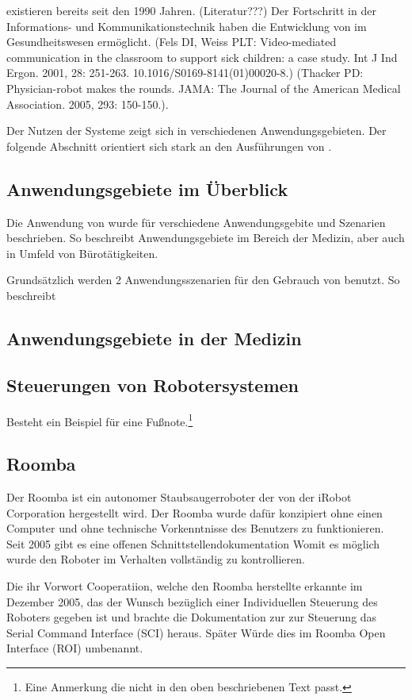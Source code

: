 \tp existieren bereits seit den 1990 Jahren. (Literatur???)
Der Fortschritt in der Informations- und Kommunikationstechnik haben die Entwicklung von \tp im Gesundheitswesen ermöglicht. (Fels DI, Weiss PLT: Video-mediated communication in the classroom to support sick children: a case study. Int J Ind Ergon. 2001, 28: 251-263. 10.1016/S0169-8141(01)00020-8.) (Thacker PD: Physician-robot makes the rounds. JAMA: The Journal of the American Medical Association. 2005, 293: 150-150.).

Der Nutzen der Systeme zeigt sich in verschiedenen Anwendungsgebieten. Der folgende Abschnitt orientiert sich stark an den Ausführungen von \cite{Kristoffersson2013}.

\subsection{Anwendungsgebiete im Überblick}
\label{section:XXX}

Die Anwendung von \tp wurde für verschiedene Anwendungsgebite und Szenarien beschrieben. So beschreibt \cite{Kristoffersson2013} Anwendungsgebiete im Bereich der Medizin, aber auch in Umfeld von Bürotätigkeiten. 

Grundsätzlich werden 2 Anwendungsszenarien für den Gebrauch von \tp benutzt. So beschreibt 
\subsection{Anwendungsgebiete in der Medizin}
\label{section:XXX}
\subsection{Steuerungen von Robotersystemen}
\label{section:XXX}

Besteht ein Beispiel für eine Fußnote.\footnote{Eine Anmerkung die nicht in den oben beschriebenen Text passt.}

\subsection{Roomba}
Der Roomba ist ein autonomer Staubsaugerroboter der von der iRobot Corporation hergestellt wird. Der Roomba wurde dafür konzipiert ohne einen Computer und ohne technische Vorkenntnisse des Benutzers zu funktionieren. Seit 2005 gibt es eine offenen Schnittstellendokumentation Womit es möglich wurde den Roboter im Verhalten vollständig zu kontrollieren.

Die ihr Vorwort Cooperatiion, welche den Roomba herstellte erkannte im Dezember 2005, das der Wunsch bezüglich einer Individuellen Steuerung des Roboters gegeben ist und brachte die Dokumentation zur zur Steuerung das Serial Command Interface (SCI) heraus. Später Würde dies im Roomba Open Interface (ROI) umbenannt.

